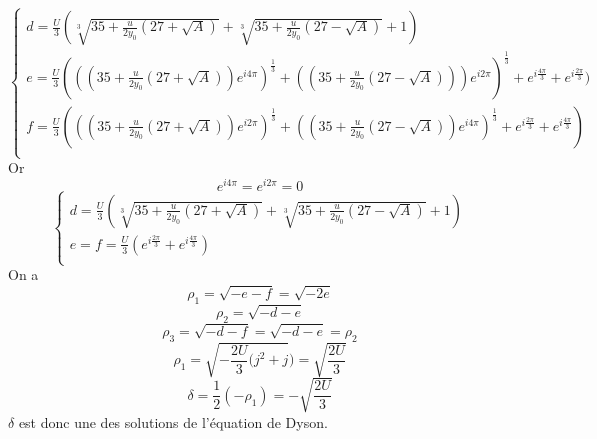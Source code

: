 \documentclass[12pt]{article}
\begin{document}
\begin{equation}
\left\{ \begin{array}{rl}
d = \frac{U}{3} ( \sqrt[3]{35+\frac{u}{2y_0}(27 + \sqrt{A})}+\sqrt[3]{35+\frac{u}{2y_0}(27 - \sqrt{A})} + 1)\\
e = \frac{U}{3} (((35+\frac{u}{2y_0}(27 + \sqrt{A})) e^{i4\pi})^{\frac{1}{3}} + ((35+\frac{u}{2y_0}(27 - \sqrt{A})))e^{i 2\pi})^{\frac{1}{3}}
+ e^{i\frac{4\pi}{3}} + e^{i\frac{2\pi}{3}} )\\
f = \frac{U}{3} (((35+\frac{u}{2y_0}(27 + \sqrt{A})) e^{i2\pi})^{\frac{1}{3}} + ((35+\frac{u}{2y_0}(27 - \sqrt{A}))e^{i 4\pi})^{\frac{1}{3}} 
+ e^{i\frac{2\pi}{3}} + e^{i\frac{4\pi}{3}} )\\
\end{array} \right.
\end{equation}
Or
\begin{equation}
 e^{i4\pi} = e^{i2\pi} = 0
\end{equation}
\begin{equation}
\left\{ \begin{array}{rl}
d = \frac{U}{3} ( \sqrt[3]{35+\frac{u}{2y_0}(27 + \sqrt{A})}+\sqrt[3]{35+\frac{u}{2y_0}(27 - \sqrt{A})} + 1)\\
e = f = \frac{U}{3} (e^{i\frac{2\pi}{3}} + e^{i\frac{4\pi}{3}} )\\
\end{array} \right.
\end{equation}
On a 
\begin{equation}
 \rho_1 = \sqrt{-e-f} = \sqrt{-2e}
\end{equation}
\begin{equation}
 \rho_2 = \sqrt{-d-e}
\end{equation}
\begin{equation}
 \rho_3 = \sqrt{-d-f} = \sqrt{-d-e} = \rho_2
\end{equation}
\begin{equation}
 \rho_1 = \sqrt{-\frac{2U}{3}(j^2+j}) = \sqrt{\frac{2U}{3}}
\end{equation}
\begin{equation}
 \delta = \frac{1}{2}(-\rho_1) = -\sqrt{\frac{2U}{3}} 
\end{equation}
$\delta$ est donc une des solutions de l'\'equation de Dyson.
\end{document}
